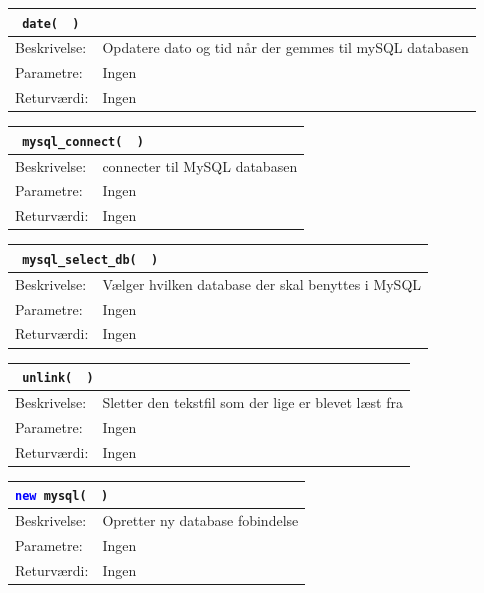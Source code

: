 \begin{table}[H]
\begin{tabular}{l p{12.5cm}}
\multicolumn{2}{l}{\texttt{\textcolor{blue}{} date( \textcolor{blue}{} )}} \\
\hline
Beskrivelse: &Opdatere dato og tid når der gemmes til mySQL databasen\\
Parametre: & Ingen\\
Returværdi: & Ingen\\
\end{tabular}
\end{table}

\begin{table}[H]
\begin{tabular}{l p{12.5cm}}
\multicolumn{2}{l}{\texttt{\textcolor{blue}{} mysql\_connect( \textcolor{blue}{} )}} \\
\hline
Beskrivelse: &connecter til MySQL databasen\\
Parametre: & Ingen\\
Returværdi: & Ingen\\
\end{tabular}
\end{table}

\begin{table}[H]
\begin{tabular}{l p{12.5cm}}
\multicolumn{2}{l}{\texttt{\textcolor{blue}{} mysql\_select\_db( \textcolor{blue}{} )}} \\
\hline
Beskrivelse: & Vælger hvilken database der skal benyttes i MySQL\\
Parametre: & Ingen\\
Returværdi: & Ingen\\
\end{tabular}
\end{table}

\begin{table}[H]
\begin{tabular}{l p{12.5cm}}
\multicolumn{2}{l}{\texttt{\textcolor{blue}{} unlink( \textcolor{blue}{} )}} \\
\hline
Beskrivelse: & Sletter den tekstfil som der lige er blevet læst fra\\
Parametre: & Ingen\\
Returværdi: & Ingen\\
\end{tabular}
\end{table}

\begin{table}[H]
\begin{tabular}{l p{12.5cm}}
\multicolumn{2}{l}{\texttt{\textcolor{blue}{new} mysql( \textcolor{blue}{} )}} \\
\hline
Beskrivelse: & Opretter ny database fobindelse\\
Parametre: & Ingen\\
Returværdi: & Ingen\\
\end{tabular}
\end{table}

